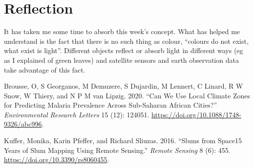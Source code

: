 \documentclass[
  letterpaper,
  DIV=11,
  numbers=noendperiod]{scrreprt}
\newlength{\cslhangindent}
\newlength{\cslentryspacingunit} %
\newenvironment{CSLReferences}[2] %
 {%
  \setlength{\parindent}{0pt}
  \ifodd #1
  \let\oldpar\par
  \def\par{\hangindent=\cslhangindent\oldpar}
  \fi
  \setlength{\parskip}{#2\cslentryspacingunit}
 }%
 {}
\begin{document}
\hypertarget{reflection}{%
\section{Reflection}\label{reflection}}

It has taken me some time to absorb this week's concept. What has helped
me understand is the fact that there is no such thing as colour,
``colours do not exist, what exist is light''. Different objects reflect
or absorb light in different ways (eg as I explained of green leaves)
and satellite sensors and earth observation data take advantage of this
fact.

\hypertarget{refs}{}
\begin{CSLReferences}{1}{0}
\leavevmode{}%
Brousse, O, S Georganos, M Demuzere, S Dujardin, M Lennert, C Linard, R
W Snow, W Thiery, and N P M van Lipzig. 2020. {``Can We Use Local
Climate Zones for Predicting Malaria Prevalence Across Sub-Saharan
African Cities?''} \emph{Environmental Research Letters} 15 (12):
124051. \url{https://doi.org/10.1088/1748-9326/abc996}.

\leavevmode{}%
Kuffer, Monika, Karin Pfeffer, and Richard Sliuzas. 2016. {``Slums from
Space{\textemdash}15 Years of Slum Mapping Using Remote Sensing.''}
\emph{Remote Sensing} 8 (6): 455.
\url{https://doi.org/10.3390/rs8060455}.

\end{CSLReferences}
\end{document}
